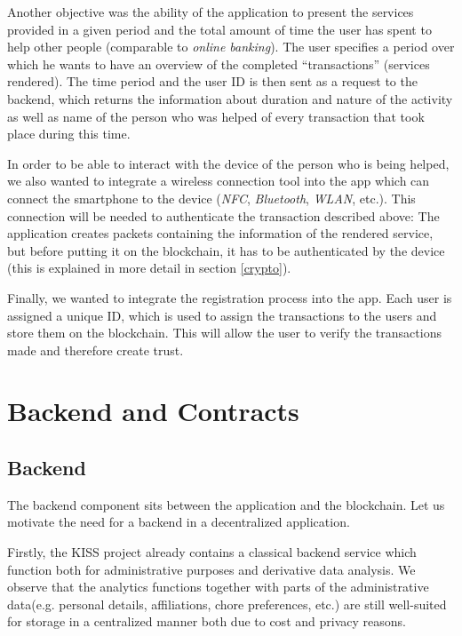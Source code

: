 \documentclass[12pt]{report}
\begin{document}
Another objective was the ability of the application to present the services provided in a given period and the total amount of time the user has spent to help other people (comparable to \emph{online banking}). The user specifies a period over which he wants to have an overview of the completed ``transactions'' (services rendered). The time period and the user ID is then sent as a request to the backend, which returns the information about duration and nature of the activity as well as name of the person who was helped of every transaction that took place during this time.

In order to be able to interact with the device of the person who is being helped, we also wanted to integrate a wireless connection tool into the app which can connect the smartphone to the device (\emph{NFC}, \emph{Bluetooth}, \emph{WLAN}, etc.). This connection will be needed to authenticate the transaction described above: The application creates packets containing the information of the rendered service, but before putting it on the blockchain, it has to be authenticated by the device (this is explained in more detail in section \ref{crypto}).

Finally, we wanted to integrate the registration process into the app. Each user is assigned a unique ID, which is used to assign the transactions to the users and store them on the blockchain. This will allow the user to verify the transactions made and therefore create trust.


\section{Backend and Contracts}\label{backend}

\subsection{Backend}
The backend component sits between the application and the blockchain. Let us motivate the need for a backend in a decentralized application.

Firstly, the KISS project already contains a classical backend service which function both for administrative purposes and derivative data analysis. We observe that the analytics functions together with parts of the administrative data(e.g. personal details, affiliations, chore preferences, etc.) are still well-suited for storage in a centralized manner both due to cost and privacy reasons.
\end{document}
